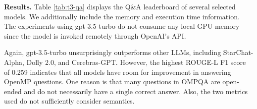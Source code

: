 \textbf{Results.} 
Table \ref{tab:t3-qa} displays the Q\&A leaderboard of several selected models. We additionally include the memory and execution time information. The experiments using gpt-3.5-turbo do not consume any local GPU memory since the model is invoked remotely through OpenAI's API.

Again, gpt-3.5-turbo unsurprisingly outperforms other LLMs, including StarChat-Alpha, Dolly 2.0, and Cerebras-GPT. However, the highest ROUGE-L F1 score of 0.259 indicates that all models have room for improvement in answering OpenMP questions. One reason is that many questions in OMPQA are open-ended and do not necessarily have a single correct answer. Also, the two metrics used do not sufficiently consider semantics.


